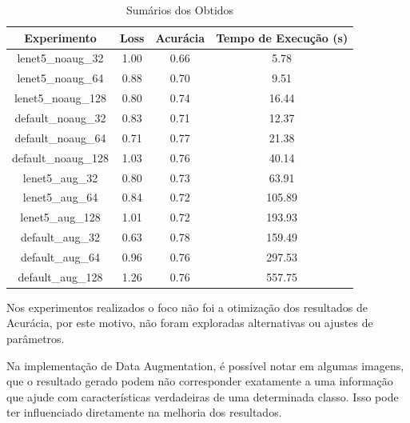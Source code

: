 \documentclass[12pt]{article}
\begin{document}
\begin{table}[!htb]
  \centering
  \begin{tabular}{|c|c|c|c|}
    \hline
    \textbf{Experimento} & \textbf{Loss} & \textbf{Acurácia} & \textbf{Tempo de Execução (s)} \\ \hline
    lenet5\_noaug\_32    & 1.00          & 0.66              & 5.78                           \\ \hline
    lenet5\_noaug\_64    & 0.88          & 0.70              & 9.51                           \\ \hline
    lenet5\_noaug\_128   & 0.80          & 0.74              & 16.44                          \\ \hline
    default\_noaug\_32   & 0.83          & 0.71              & 12.37                          \\ \hline
    default\_noaug\_64   & 0.71          & 0.77              & 21.38                          \\ \hline
    default\_noaug\_128  & 1.03          & 0.76              & 40.14                          \\ \hline
    lenet5\_aug\_32      & 0.80          & 0.73              & 63.91                          \\ \hline
    lenet5\_aug\_64      & 0.84          & 0.72              & 105.89                         \\ \hline
    lenet5\_aug\_128     & 1.01          & 0.72              & 193.93                         \\ \hline
    default\_aug\_32     & 0.63          & 0.78              & 159.49                         \\ \hline
    default\_aug\_64     & 0.96          & 0.76              & 297.53                         \\ \hline
    default\_aug\_128    & 1.26          & 0.76              & 557.75                         \\ \hline
  \end{tabular}
  \caption{Sumários dos Obtidos}
  \label{tab:summary}
\end{table}

Nos experimentos realizados o foco não foi a otimização dos resultados de Acurácia, por este motivo, não foram exploradas alternativas ou ajustes de parâmetros.

Na implementação de Data Augmentation, é possível notar em algumas imagens, que o resultado gerado podem não corresponder exatamente a uma informação que ajude com características verdadeiras de uma determinada classo. Isso pode ter influenciado diretamente na melhoria dos resultados.
\end{document}

